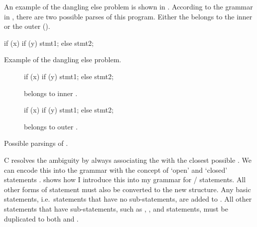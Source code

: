 \documentclass[00-main.tex]{subfiles}
\begin{document}
An example of the dangling else problem is shown in .
According to the grammar in , there are two possible parses of this program.
Either the  belongs to the inner or the outer  ().

\begin{listing}[!ht]
  \begin{CListing}
    if (x)
      if (y)
        stmt1;
    else
      stmt2;
  \end{CListing}
  \caption{Example of the dangling else problem.}
  \label{lst:dangling else}
\end{listing}

\begin{listing}[!ht]
  \begin{subfigure}[t]{0.49\textwidth}
    \begin{CListing}
      if (x) {
        if (y) {
          stmt1;
        } else {
          stmt2;
        }
      }
    \end{CListing}
    \caption{ belongs to inner .}
  \end{subfigure}
  \hfill
  \begin{subfigure}[t]{0.49\textwidth}
    \begin{CListing}
      if (x) {
        if (y) {
          stmt1;
        }
      } else {
        stmt2;
      }
    \end{CListing}
    \caption{ belongs to outer .}
  \end{subfigure}
  \caption{Possible parsings of .}
  \label{lst:dangling else possible parsings}
\end{listing}

C resolves the ambiguity by always associating the  with the closest possible .
We can encode this into the grammar with the concept of `open' and `closed' statements .
 shows how I introduce this into my grammar for / statements.
All other forms of statement must also be converted to the new structure.
Any basic statements, i.e.\ statements that have no sub-statements, are added to .
All other statements that have sub-statements, such as , , and  statements, must be duplicated to both  and .
\end{document}
